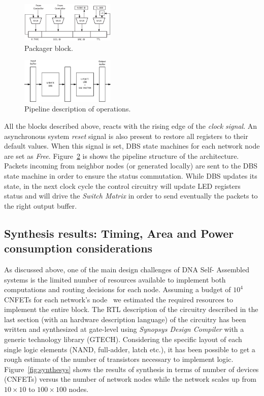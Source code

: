 \begin{figure}
  \centering
  \includegraphics[width=0.40\textwidth]{pictures/packager.eps}
  \caption{Packager block.}
 \label{fig:packager}
\end{figure}

\begin{figure}
  \centering
  \includegraphics[width=0.40\textwidth]{pictures/pipeline.eps}
  \caption{Pipeline description of \disr{} operations.}
 \label{fig:pipeline}
\end{figure}

All the blocks described above, reacts with the rising edge of
the \emph{clock signal}. An asynchronous system \emph{reset} signal is
also present to restore all registers to their default values. When
this signal is set, DBS state machines for each network
node are set as \emph{Free}.  
Figure~\ref{fig:pipeline} is shows the pipeline structure of the
\disr{} architecture. Packets incoming from neighbor nodes (or
generated locally) are sent to the DBS state machine in order to
ensure the status commutation. While DBS updates its state, in the
next clock cycle the control circuitry will update LED registers status and
will drive the \emph{Switch Matrix} in order to send eventually the packets to
the right output buffer.
\subsection{Synthesis results: Timing, Area and Power consumption considerations}

As discussed above, one of the main design challenges of DNA Self-
Assembled systems is the limited number of resources available to implement both
computations and routing decisions for each node. Assuming a budget of
$10^4$ CNFETs for each network's node~\cite{liu_jetcs}  we estimated
the required resources to implement the entire \disr{} block. The RTL
description of the circuitry described in the last section (with an
hardware description language)  of the \disr{} circuitry has been written
and synthesized at gate-level using \emph{Synopsys Design Compiler} with 
a generic technology library (GTECH).
Considering the specific layout of each single logic elements  (NAND,
full-adder, latch etc.), it has been possible to get a rough estimate
of the number of transistors necessary to implement \disr{} logic.
Figure~\ref{fig:synthesys} shows the results of synthesis in terms of
number of devices (CNFETs) versus the number of network nodes while
the network scales up from $10\times10$ to $100\times100$ nodes.

